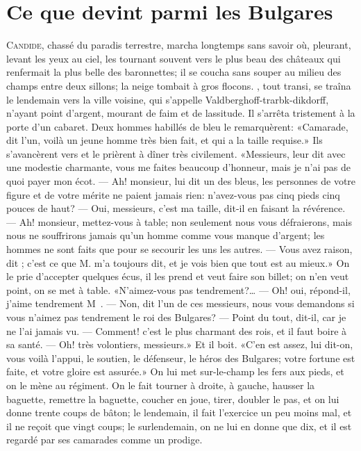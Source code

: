 \chapter{Ce que devint  parmi les Bulgares}


\lettrine{C}{andide}, chassé du paradis terrestre, marcha longtemps sans savoir où,
pleurant, levant les yeux au ciel, les tournant souvent vers le plus
beau des châteaux qui renfermait la plus belle des baronnettes; il se
coucha sans souper au milieu des champs entre deux sillons; la neige
tombait à gros flocons. , tout transi, se traîna le lendemain
vers la ville voisine, qui s’appelle Valdberghoff-trarbk-dikdorff,
n’ayant point d’argent, mourant de faim et de lassitude. Il s’arrêta
tristement à la porte d’un cabaret. Deux hommes habillés de bleu le
remarquèrent: «Camarade, dit l’un, voilà un jeune homme très bien fait,
et qui a la taille requise.» Ils s’avancèrent vers  et le
prièrent à dîner très civilement.  «Messieurs, leur dit  avec une
modestie charmante, vous me faites beaucoup d’honneur, mais je n’ai pas
de quoi payer mon écot. — Ah! monsieur, lui dit un des bleus, les
personnes de votre figure et de votre mérite ne paient jamais rien:
n’avez-vous pas cinq pieds cinq pouces de haut? — Oui, messieurs, c’est
ma taille, dit-il en faisant la révérence. — Ah! monsieur, mettez-vous à
table; non seulement nous vous défraierons, mais nous ne souffrirons
jamais qu’un homme comme vous manque d’argent; les hommes ne sont faits
que pour se secourir les uns les autres. — Vous avez raison, dit ;
c’est ce que M.  m’a toujours dit, et je vois bien que tout est
au mieux.» On le prie d’accepter quelques écus, il les prend et veut
faire son billet; on n’en veut point, on se met à table. «N’aimez-vous
pas tendrement?… — Oh! oui, répond-il, j’aime tendrement M~. — Non, dit l’un de ces messieurs, nous vous demandons si vous
n’aimez pas tendrement le roi des Bulgares? — Point du tout, dit-il, car
je ne l’ai jamais vu. — Comment! c’est le plus charmant des rois, et il
faut boire à sa santé. — Oh! très volontiers, messieurs.» Et il boit. «C’en
est assez, lui dit-on, vous voilà l’appui, le soutien, le défenseur, le
héros des Bulgares; votre fortune est faite, et votre gloire est
assurée.» On lui met sur-le-champ les fers aux pieds, et on le mène au
régiment. On le fait tourner à droite, à gauche, hausser la baguette,
remettre la baguette, coucher en joue, tirer, doubler le pas, et on lui
donne trente coups de bâton; le lendemain, il fait l’exercice un peu
moins mal, et il ne reçoit que vingt coups; le surlendemain, on ne lui
en donne que dix, et il est regardé par ses camarades comme un prodige.


